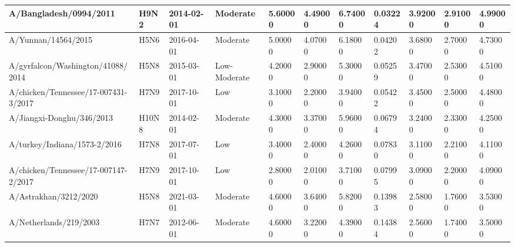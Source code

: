 \begin{tabular}{L{1in}|L{1in}|L{1in}|L{1in}|L{1in}|L{1in}|L{1in}|L{1in}|L{1in}|L{1in}|L{1in}}
 A/Bangladesh/0994/2011 &H9N2&2014-02-01& Moderate &5.60000&4.49000&6.74000&0.03224&3.92000&2.91000&4.99000\\\hline
 A/Yunnan/14564/2015 &H5N6&2016-04-01& Moderate &5.00000&4.07000&6.18000&0.04202&3.68000&2.70000&4.73000\\\hline
 A/gyrfalcon/Washington/41088/2014 &H5N8&2015-03-01& Low-Moderate &4.20000&2.90000&5.30000&0.05259&3.47000&2.53000&4.51000\\\hline
 A/chicken/Tennessee/17-007431-3/2017 &H7N9&2017-10-01&Low&3.10000&2.20000&3.94000&0.05422&3.45000&2.50000&4.48000\\\hline
 A/Jiangxi-Donghu/346/2013 &H10N8&2014-02-01& Moderate &4.30000&3.37000&5.96000&0.06794&3.24000&2.33000&4.25000\\\hline
 A/turkey/Indiana/1573-2/2016 &H7N8&2017-07-01&Low&3.40000&2.40000&4.26000&0.07830&3.11000&2.21000&4.11000\\\hline
 A/chicken/Tennessee/17-007147-2/2017 &H7N9&2017-10-01&Low&2.80000&2.01000&3.71000&0.07995&3.09000&2.20000&4.09000\\\hline
 A/Astrakhan/3212/2020 &H5N8&2021-03-01& Moderate &4.60000&3.64000&5.82000&0.13983&2.58000&1.76000&3.53000\\\hline
 A/Netherlands/219/2003 &H7N7&2012-06-01& Moderate &4.60000&3.22000&4.39000&0.14384&2.56000&1.74000&3.50000\\\hline
\hline\end{tabular}
